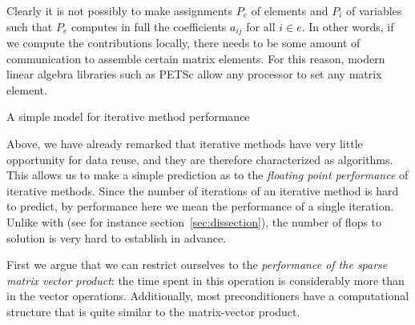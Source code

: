 Clearly it is not possibly to make assignments $P_e$ of elements and
$P_i$ of variables such that $P_e$ computes in full the coefficients
$a_{ij}$ for all $i\in e$. In other words, if we compute the
contributions locally, there needs to be some amount of communication to
assemble certain matrix elements.
For this reason, modern linear algebra libraries such as PETSc
allow any processor to set any
matrix element.

 {A simple model for iterative method performance}

Above, we have already remarked that iterative methods have very little
opportunity for data reuse, and they are therefore characterized as
 algorithms. This allows us to make a simple
prediction as to the
\emph{floating point performance}%
of iterative methods.
Since the number of iterations of an iterative method is hard to predict,
by performance here we mean the performance of a single iteration.
Unlike with 
(see for instance section~\ref{sec:dissection}),
the number of flops to solution is very hard to establish in advance.

First we argue that we can restrict ourselves to the \emph{performance of the sparse
  matrix vector product}:
the time spent in this operation is considerably more than in the vector operations.
Additionally, most preconditioners have a computational structure that is
quite similar to the matrix-vector product.

